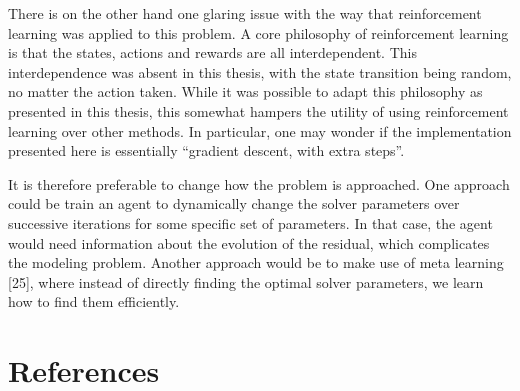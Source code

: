 \documentclass[
  letterpaper,
]{report}
\theoremstyle{plain}
\theoremstyle{definition}
\theoremstyle{definition}
\theoremstyle{remark}
\begin{document}
There is on the other hand one glaring issue with the way that
reinforcement learning was applied to this problem. A core philosophy of
reinforcement learning is that the states, actions and rewards are all
interdependent. This interdependence was absent in this thesis, with the
state transition being random, no matter the action taken. While it was
possible to adapt this philosophy as presented in this thesis, this
somewhat hampers the utility of using reinforcement learning over other
methods. In particular, one may wonder if the implementation presented
here is essentially ``gradient descent, with extra steps''.

It is therefore preferable to change how the problem is approached. One
approach could be train an agent to dynamically change the solver
parameters over successive iterations for some specific set of
parameters. In that case, the agent would need information about the
evolution of the residual, which complicates the modeling problem.
Another approach would be to make use of meta learning {[}25{]}, where
instead of directly finding the optimal solver parameters, we learn how
to find them efficiently.


\hypertarget{references}{%
\chapter*{References}\label{references}}

\end{document}
